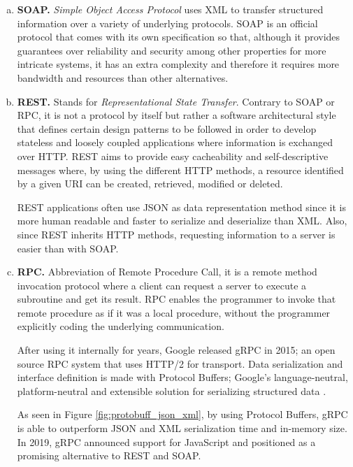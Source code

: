 \begin{enumerate}[a)]
	\item \textbf{SOAP.} \textit{Simple Object Access Protocol} \cite{SOAP} uses XML to transfer structured information over a variety of underlying protocols. SOAP is an official protocol that comes with its own specification so that, although it provides guarantees over reliability and security among other properties for more intricate systems, it has an extra complexity and therefore it requires more bandwidth and resources than other alternatives.

	\item \textbf{REST.} Stands for \textit{Representational State Transfer}. Contrary to SOAP or RPC, it is not a protocol by itself but rather a software architectural style that defines certain design patterns to be followed in order to develop stateless and loosely coupled applications where information is exchanged over HTTP. REST aims to provide easy cacheability and self-descriptive messages where, by using  the different HTTP  methods, a resource identified by a given URI can be created, retrieved, modified or deleted. 
	
	REST applications often use JSON as data representation method since it is more human readable and faster to serialize and deserialize than XML. Also, since REST inherits HTTP methods, requesting information to a server is easier than with SOAP.

	\item \textbf{RPC.} Abbreviation of Remote Procedure Call, it is a remote method invocation protocol where a client can request a server to execute a subroutine and get its result. RPC enables the programmer to invoke that remote procedure as if it was a local procedure, without the programmer explicitly coding the underlying communication.
	
	After using it internally for years, Google released gRPC \cite{grpc} in 2015; an open source RPC system that uses HTTP/2 for transport. Data serialization and interface definition is made with Protocol Buffers; Google's language-neutral, platform-neutral and extensible solution for serializing structured data \cite{protobuf}.
	
	As seen in Figure \ref{fig:protobuff_json_xml}, by using Protocol Buffers, gRPC is able to outperform JSON and XML serialization time and in-memory size. In 2019, gRPC announced support for JavaScript \cite{grpc-web-announce} and positioned as a promising alternative to REST and SOAP.
	

\end{enumerate}
